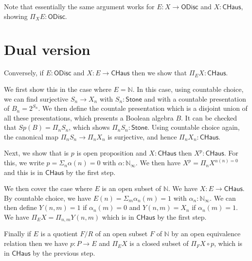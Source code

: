 \documentclass[10pt,a4paper]{article}
\newcommand{\nats}{\mathbb{N}}
\newcommand{\ODisc}{\mathsf{ODisc}}
\newcommand{\Stone}{\mathsf{Stone}}
\newcommand{\CHaus}{\mathsf{CHaus}}
\newcommand{\Noo}{\nats_{\infty}}
\begin{document}
\medskip

Note that essentially the same argument works for $E:X\rightarrow \ODisc$ and $X:\CHaus$, showing 
$\Pi_XE:\ODisc$.

\section{Dual version}

Conversely, if $E:\ODisc$ and $X:E\rightarrow \CHaus$ then we show that $\Pi_EX:\CHaus$.


We first show this in the case where $E = \nats$. In this case, using countable choice, we can find
surjective $S_n\rightarrow X_n$ with $S_n:\Stone$ and with a countable presentation of $B_n = 2^{S_n}$.
We then define the countale presentation which is a disjoint union of all these presentations, which
presents a Boolean algebra $B$. It can be checked that $Sp(B) = \Pi_n S_n$, which shows $\Pi_n S_n:\Stone$.
Using countable choice again, the canonical map $\Pi_n S_n\rightarrow \Pi_n X_n$ is surjective, and
hence $\Pi_n X_n:\CHaus.$

Next, we show that is $p$ is open proposition and $X:\CHaus$ then $X^p:\CHaus$. For this, we write
$p = \Sigma_n \alpha(n) = 0$  with $\alpha:\Noo$. We then have $X^p = \Pi_n X^{\alpha(n) = 0}$
and this is in $\CHaus$ by the first step.

We then cover the case where $E$ is an open subset of $\nats$. We have $X:E\rightarrow\CHaus$.
By countable choice, we have $E(n) = \Sigma_m\alpha_n(m) = 1$
with $\alpha_n :\Noo$. We can then define $Y(n,m) = 1$ if $\alpha_n(m) = 0$ and $Y(n,m) = X_n$ if $\alpha_n(m) = 1$.
We have $\Pi_E X = \Pi_{n,m}Y(n,m)$ which is in $\CHaus$ by the first step.

Finally if $E$ is a quotient $F/R$ of an open subset $F$ of $\nats$ by an open equivalence relation
then we have $p:P\rightarrow E$ and $\Pi_EX$ is a closed subset of $\Pi_F X\circ p$, which is in $\CHaus$ by
the previous step.
\end{document}

